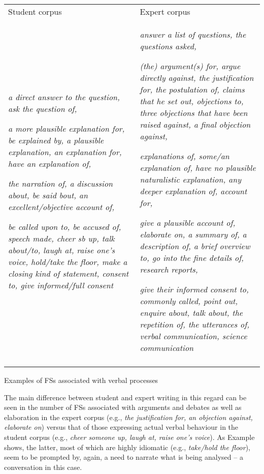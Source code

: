 \documentclass[output=paper]{langsci/langscibook}
\begin{document}
\begin{tabularx}{\textwidth}{XX}

\lsptoprule

Student corpus & Expert corpus\\
\textit{a direct answer to the question, ask the question of,} 

\textit{a more plausible explanation for, be explained by, a plausible explanation, an explanation for, have an explanation of,}

\textit{the narration of, a discussion about, be said bout, an excellent/objective account of,}

\textit{be called upon to, be accused of, speech made, cheer sb up, talk about/to, laugh at, raise one’s voice, hold/take the floor, make a closing kind of statement, consent to, give informed/full consent} & \textit{answer a list of questions, the questions asked,} 

\textit{(the) argument(s) for, argue directly against, the justification for, the postulation of, claims that he set out, objections to, three objections that have been raised against, a final objection against,} 

\textit{explanations of, some/an explanation of, have no plausible naturalistic explanation, any deeper explanation of, account for,} 

\textit{give a plausible account of, elaborate on, a summary of, a description of, a brief overview to, go into the fine details of, research reports,}

\textit{give their informed consent to, commonly called, point out, enquire about, talk about, the repetition of, the utterances of, verbal communication, science communication}\\
\lspbottomrule
\end{tabularx}
\begin{table}
\caption{Examples of FSs associated with verbal processes}
\label{tab:key:7}
\end{table}

The main difference between student and expert writing in this regard can be seen in the number of FSs associated with arguments and debates as well as elaboration in the expert corpus (e.g., \textit{the justification for, an objection against, elaborate on}) versus that of those expressing actual verbal behaviour in the student corpus (e.g., \textit{cheer someone up, laugh at, raise one’s voice}). As Example  shows, the latter, most of which are highly idiomatic (e.g., \textit{take/hold the floor}), seem to be prompted by, again, a need to narrate what is being analysed – a conversation in this case.
\end{document}
